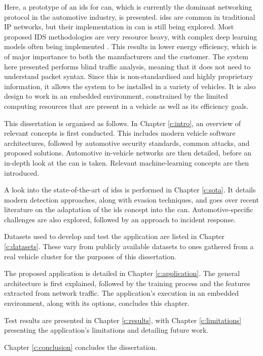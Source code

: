 Here, a prototype of an \gls{ids} for \gls{can}, which is currently the dominant networking protocol in the automotive industry, is presented. \glspl{ids} are common in traditional IP networks, but their implementation in \gls{can} is still being explored. Most proposed IDS methodologies are very resource heavy, with complex deep learning models often being implemented \citep{ahmad2021network}. This results in lower energy efficiency, which is of major importance to both the manufacturers and the customer. The system here presented performs blind traffic analysis, meaning that it does not need to understand packet syntax. Since this is non-standardised and highly proprietary information, it allows the system to be installed in a variety of vehicles. It is also design to work in an embedded environment, constrained by the limited computing resources that are present in a vehicle as well as its efficiency goals.\par

This dissertation is organised as follows. In Chapter \ref{c:intro}, an overview of relevant concepts is first conducted. This includes modern vehicle software architectures, followed by automotive security standards, common attacks, and proposed solutions. Automotive in-vehicle networks are then detailed, before an in-depth look at the \acrlong{can} is taken. Relevant machine-learning concepts are then introduced.\par
A look into the state-of-the-art of \glspl{ids} is performed in Chapter \ref{c:sota}. It details modern detection approaches, along with evasion techniques, and goes over recent literature on the adaptation of the \gls{ids} concept into the \acrlong{can}. Automotive-specific challenges are also explored, followed by an approach to incident response.\par
Datasets used to develop and test the application are listed in Chapter \ref{c:datasets}. These vary from publicly available datasets to ones gathered from a real vehicle cluster for the purposes of this dissertation.\par
The proposed application is detailed in Chapter \ref{c:application}. The general architecture is first explained, followed by the training process and the features extracted from network traffic. The application's execution in an embedded environment, along with its options, concludes this chapter.\par
Test results are presented in Chapter \ref{c:results}, with Chapter \ref{c:limitations} presenting the application's limitations and detailing future work.\par
Chapter \ref{c:conclusion} concludes the dissertation.